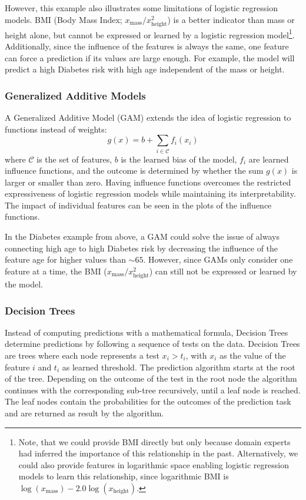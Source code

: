 However, this example also illustrates some limitations of logistic regression models.
BMI (Body Mass Index; $x_\text{mass} / x_\text{height}^2$) is a better indicator than mass or height alone, but cannot be expressed or learned by a logistic regression model\footnote{Note, that we could provide BMI directly but only because domain experts had inferred the importance of this relationship in the past. Alternatively, we could also provide features in logarithmic space enabling logistic regression models to learn this relationship, since logarithmic BMI is $\log{(x_\text{mass})} - 2.0 \log{(x_\text{height})}$.}.
Additionally, since the influence of the features is always the same, one feature can force a prediction if its values are large enough.
For example, the model will predict a high Diabetes risk with high age independent of the mass or height.

\subsubsection{Generalized Additive Models}
A Generalized Additive Model (GAM) extends the idea of logistic regression  to functions instead of weights:
\[
g(x) = b + \sum_{i \in \mathcal{C}} f_i(x_i)
\]
where $\mathcal{C}$ is the set of features, $b$ is the learned bias of the model, $f_i$ are learned influence functions, and the outcome is determined by whether the sum $g(x)$ is larger or smaller than zero.
Having influence functions overcomes the restricted expressiveness of logistic regression models while maintaining its interpretability.
The impact of individual features can be seen in the plots of the influence functions.

In the Diabetes example from above, a GAM could solve the issue of always connecting high age to high Diabetes risk by decreasing the influence of the feature age for higher values than ${\sim}65$.
However, since GAMs only consider one feature at a time, the BMI ($x_\text{mass} / x_\text{height}^2$) can still not be expressed or learned by the model.

\subsubsection{Decision Trees}
Instead of computing predictions with a mathematical formula, Decision Trees determine predictions by following a sequence of tests on the data.
Decision Trees are trees where each node represents a test $x_i > t_i$, with $x_i$ as the value of the feature $i$ and $t_i$ as learned threshold.
The prediction algorithm starts at the root of the tree.
Depending on the outcome of the test in the root node the algorithm continues with the corresponding sub-tree recursively, until a leaf node is reached.
The leaf nodes contain the probabilities for the outcomes of the prediction task and are returned as result by the algorithm.

